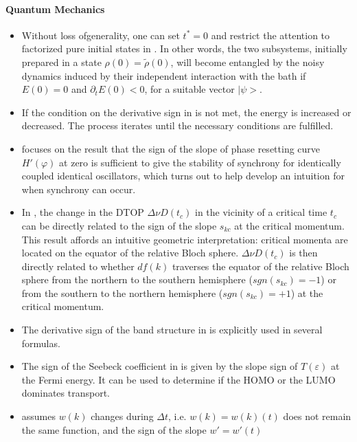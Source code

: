 \documentclass[11pt]{book}
\begin{document}
\paragraph{Quantum Mechanics}
\begin{itemize}
\item Without loss ofgenerality, one can set $t^{\ast}=0$ and restrict
the attention to factorized pure initial states in \cite{benatti2003environment}.
In other words, the two subsystems, initially prepared in a state
$\rho(0)=\tilde{\rho}(0)$, will become entangled by the noisy dynamics
induced by their independent interaction with the bath if $E(0)=0$
and $\partial_{t}E(0)<0$, for a suitable vector $|\psi>$.
\item If the condition on the derivative sign in \cite{godoy2005effects}
is not met, the energy is increased or decreased. The process iterates
until the necessary conditions are fulfilled.
\item \cite{achuthan2011synaptic}
focuses on the result that the sign of the slope of phase resetting
curve $H'\left(\varphi\right)$ at zero is sufficient to give the
stability of synchrony for identically coupled identical oscillators,
which turns out to help develop an intuition for when synchrony can
occur.
\item In \cite{budich2016dynamical},
the change in the DTOP $\Delta\nu D\left(t_{c}\right)$ in the vicinity
of a critical time $t_{c}$ can be directly related to the sign of
the slope $s_{kc}$ at the critical momentum. This result affords
an intuitive geometric interpretation: critical momenta are located
on the equator of the relative Bloch sphere. $\Delta\nu D\left(t_{c}\right)$
is then directly related to whether $df\left(k\right)$ traverses
the equator of the relative Bloch sphere from the northern to the
southern hemisphere ($sgn\left(s_{kc}\right)=-1$) or from the southern
to the northern hemisphere ($sgn\left(s_{kc}\right)=+1$) at the critical
momentum.
\item The derivative sign of the band structure in \cite{baireuther2016scattering}
is explicitly used in several formulas.
\item The sign of the Seebeck coefficient in \cite{gehring2019single}
is given by the slope sign of $T\left(\varepsilon\right)$ at the
Fermi energy. It can be used to determine if the HOMO or the LUMO
dominates transport.
\item \cite{hollestelle2021some}
assumes $w\left(k\right)$ changes during $\Delta t$, i.e. $w\left(k\right)=w\left(k\right)\left(t\right)$
does not remain the same function, and the sign of the slope $w'=w'\left(t\right)$

\end{itemize}
\end{document}
